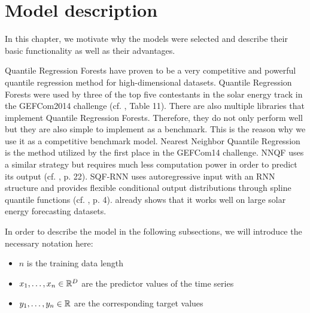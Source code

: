 \chapter{Model description}
\label{ch:model-description}

In this chapter, we motivate why the models were selected and 
describe their basic functionality as well as their advantages.

Quantile Regression Forests have proven to be a very competitive 
and powerful quantile regression method for high-dimensional datasets. 
Quantile Regression Forests were used by three of the top five contestants 
in the solar energy track in the GEFCom2014 challenge (cf. \Textcite{Hong2016}, Table 11). 
There are also multiple libraries that implement Quantile Regression Forests.
Therefore, they do not only perform 
well but they are also simple to implement as a benchmark.
This is the reason why we use it as a competitive benchmark model.
Nearest Neighbor Quantile Regression is the method utilized by the first place 
in the GEFCom14 challenge. NNQF uses a similar strategy but requires much less 
computation power in order to predict its output (cf. \Textcite{Ordiano2019}, p. 22). 
SQF-RNN uses autoregressive input with an RNN structure and provides flexible 
conditional output distributions through spline quantile functions (cf. \Textcite{Gasthaus2019}, p. 4). 
\Textcite{Gasthaus2019} already shows that it works well on large solar energy 
forecasting datasets.

In order to describe the model in the following subsections, we will introduce the necessary notation here:
\begin{itemize}
    \item \(n\) is the training data length
    \item \(x_1, \ldots, x_n \in \mathbb{R}^D\) are the predictor values of the time series
    \item \(y_1, \ldots, y_n \in \mathbb{R}\) are the corresponding target values
\end{itemize}





